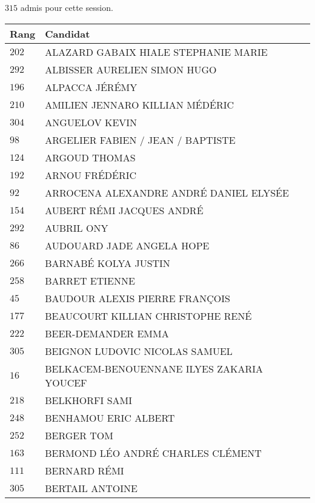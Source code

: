 




  $315$ admis pour cette session.

  \begin{xltabular}{\linewidth}{|l|X|}
    \hline
    \textbf{Rang} & \textbf{Candidat} \\
    \hline
    $202$ & ALAZARD GABAIX HIALE STEPHANIE MARIE \\
    \hline
    $292$ & ALBISSER AURELIEN SIMON HUGO \\
    \hline
    $196$ & ALPACCA JÉRÉMY \\
    \hline
    $210$ & AMILIEN JENNARO KILLIAN MÉDÉRIC \\
    \hline
    $304$ & ANGUELOV KEVIN \\
    \hline
    $98$ & ARGELIER FABIEN / JEAN / BAPTISTE \\
    \hline
    $124$ & ARGOUD THOMAS \\
    \hline
    $192$ & ARNOU FRÉDÉRIC \\
    \hline
    $92$ & ARROCENA ALEXANDRE ANDRÉ DANIEL ELYSÉE \\
    \hline
    $154$ & AUBERT RÉMI JACQUES ANDRÉ \\
    \hline
    $292$ & AUBRIL ONY \\
    \hline
    $86$ & AUDOUARD JADE ANGELA HOPE \\
    \hline
    $266$ & BARNABÉ KOLYA JUSTIN \\
    \hline
    $258$ & BARRET ETIENNE \\
    \hline
    $45$ & BAUDOUR ALEXIS PIERRE FRANÇOIS \\
    \hline
    $177$ & BEAUCOURT KILLIAN CHRISTOPHE RENÉ \\
    \hline
    $222$ & BEER-DEMANDER EMMA \\
    \hline
    $305$ & BEIGNON LUDOVIC NICOLAS SAMUEL \\
    \hline
    $16$ & BELKACEM-BENOUENNANE ILYES ZAKARIA YOUCEF \\
    \hline
    $218$ & BELKHORFI SAMI \\
    \hline
    $248$ & BENHAMOU ERIC ALBERT \\
    \hline
    $252$ & BERGER TOM \\
    \hline
    $163$ & BERMOND LÉO ANDRÉ CHARLES CLÉMENT \\
    \hline
    $111$ & BERNARD RÉMI \\
    \hline
    $305$ & BERTAIL ANTOINE \\

\end{xltabular}
